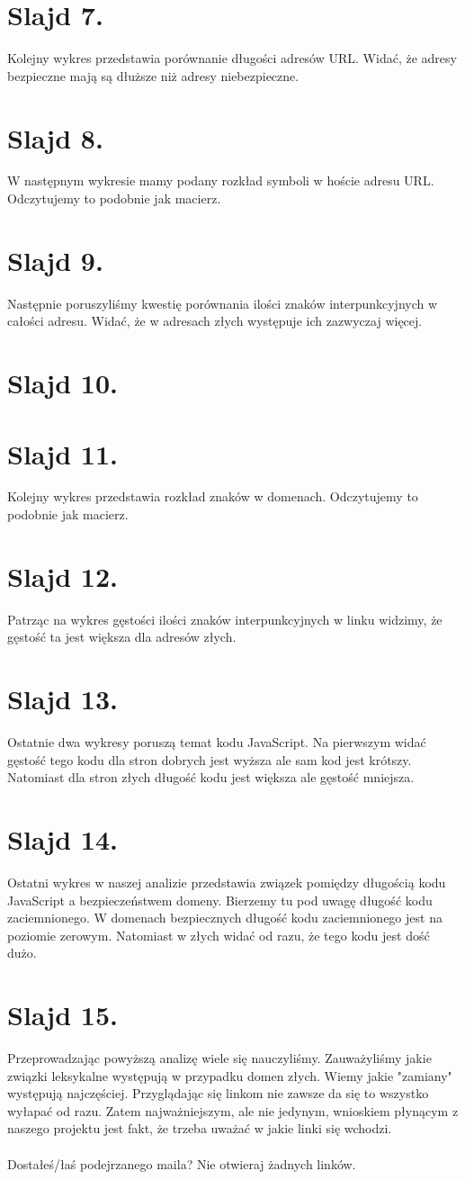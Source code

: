 \documentclass{article}
\begin{document}
\section{Slajd 7.}
{
	Kolejny wykres przedstawia porównanie długości adresów URL. Widać, że adresy bezpieczne mają są dłuższe niż adresy niebezpieczne.
}
\section{Slajd 8.}
{
	W następnym wykresie mamy podany rozkład symboli w hoście adresu URL. Odczytujemy to podobnie jak macierz.
}
\section{Slajd 9.}
{
	Następnie poruszyliśmy kwestię porównania ilości znaków interpunkcyjnych w całości adresu. Widać, że w adresach złych występuje ich zazwyczaj więcej.
}
\section{Slajd 10.}
{
	
}
\section{Slajd 11.}
{
	Kolejny wykres przedstawia rozkład znaków w domenach. Odczytujemy to podobnie jak macierz.
}
\section{Slajd 12.}
{
	Patrząc na wykres gęstości ilości znaków interpunkcyjnych w linku widzimy, że gęstość ta jest większa dla adresów złych.
}
\section{Slajd 13.}
{
	Ostatnie dwa wykresy poruszą temat kodu JavaScript. Na pierwszym widać gęstość tego kodu dla stron dobrych jest wyższa ale sam kod jest krótszy. Natomiast dla stron złych długość kodu jest większa ale gęstość mniejsza. 
}
\section{Slajd 14.}
{
	Ostatni wykres w naszej analizie przedstawia związek pomiędzy długością kodu JavaScript a bezpieczeństwem domeny. Bierzemy tu pod uwagę długość kodu zaciemnionego. W domenach bezpiecznych długość kodu zaciemnionego jest na poziomie zerowym. Natomiast w złych widać od razu, że tego kodu jest dość dużo.
}
\section{Slajd 15.}
{
	Przeprowadzając powyższą analizę wiele się nauczyliśmy. Zauważyliśmy jakie związki leksykalne występują w przypadku domen złych. Wiemy jakie "zamiany" występują najczęściej. Przyglądając się linkom nie zawsze da się to wszystko wyłapać od razu. Zatem najważniejszym, ale nie jedynym, wnioskiem płynącym z naszego projektu jest fakt, że trzeba uważać w jakie linki się wchodzi.\\
	~\\
	Dostałeś/łaś podejrzanego maila? Nie otwieraj żadnych linków.
}
\end{document}
